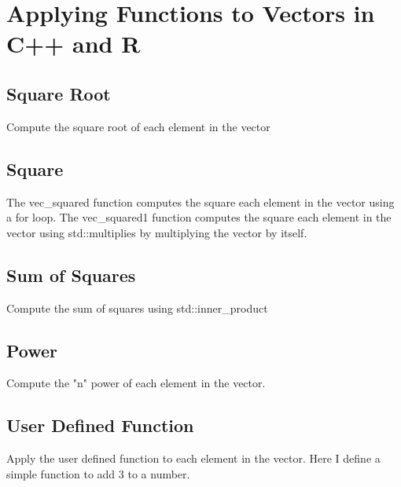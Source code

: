 \chapter{Applying Functions to Vectors in C++ and R}

\section{Square Root}
Compute the square root of each element in the vector

\lstset{language=C++}


\section{Square}
The vec\_squared function computes the square each element in the vector using a for loop. The vec\_squared1 function computes the square each element in the vector using std::multiplies by multiplying the vector by itself.

\lstset{language=C++}


\section{Sum of Squares}
Compute the sum of squares using std::inner\_product

\lstset{language=C++}


\section{Power}
Compute the "n" power of each element in the vector.

\lstset{language=C++}


\section{User Defined Function}
Apply the user defined function to each element in the vector. Here I define a simple function to add 3 to a number.

\lstset{language=C++}
